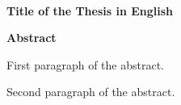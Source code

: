 
\begin{center}
  \HRule\\[0.4cm]
  \Large\bfseries
  Title of the Thesis in English
  \HRule\\[1.5cm]
\end{center}

\begin{center}
  \bfseries
  \large
  Abstract
\end{center}

\noindent
First paragraph of the abstract.
\blindtext

Second paragraph of the abstract.
\blindtext

\cleardoublepage
